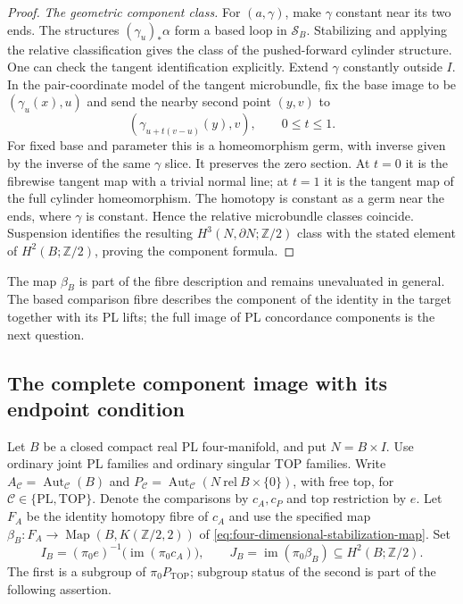 \begin{proof}
\emph{The geometric component class.}
For $(a,\gamma)$, make $\gamma$ constant near its two ends.
The structures $(\gamma_u)_*\alpha$ form a based loop in
$\mathcal S_B$.  Stabilizing and applying the relative classification
gives the class of the pushed-forward cylinder structure.  One can
check the tangent identification explicitly.  Extend $\gamma$
constantly outside $I$.  In the pair-coordinate model of the tangent
microbundle, fix the base image to be $(\gamma_u(x),u)$ and send the
nearby second point $(y,v)$ to
\[
 (\gamma_{u+t(v-u)}(y),v),\qquad 0\leq t\leq1.
\]
For fixed base and parameter this is a homeomorphism germ, with
inverse given by the inverse of the same $\gamma$ slice.  It
preserves the zero section.  At $t=0$ it is the fibrewise tangent
map with a trivial normal line; at $t=1$ it is the tangent map of
the full cylinder homeomorphism.  The homotopy is constant as a
germ near the ends, where $\gamma$ is constant.  Hence the relative
microbundle classes coincide.  Suspension identifies the resulting
$H^3(N,\partial N;\mathbb Z/2)$ class with the stated element of
$H^2(B;\mathbb Z/2)$, proving the component formula.
\end{proof}

The map $\beta_B$ is part of the fibre description and remains
unevaluated in general. The based comparison fibre describes the
component of the identity in the target together with its PL lifts;
the full image of PL concordance components is the next question.


\subsection{The complete component image with its endpoint condition}

Let $B$ be a closed compact real PL four-manifold, and put $N=B\times I$.
Use ordinary joint PL families and ordinary singular TOP families.
Write $A_{\mathcal C}=\operatorname{Aut}_{\mathcal C}(B)$ and
$P_{\mathcal C}=\operatorname{Aut}_{\mathcal C}
(N\ \mathrm{rel}\ B\times\{0\})$, with free top, for
$\mathcal C\in\{\mathrm{PL},\mathrm{TOP}\}$.  Denote the comparisons
by $c_A,c_P$ and top restriction by $e$.  Let $F_A$ be the identity
homotopy fibre of $c_A$ and use the specified map
$\beta_B:F_A\to\operatorname{Map}(B,K(\mathbb Z/2,2))$ of
\eqref{eq:four-dimensional-stabilization-map}.  Set
\[
 I_B=(\pi_0e)^{-1}\bigl(\operatorname{im}(\pi_0c_A)\bigr),
 \qquad J_B=\operatorname{im}(\pi_0\beta_B)
       \subseteq H^2(B;\mathbb Z/2).
\]
The first is a subgroup of $\pi_0P_{\mathrm{TOP}}$; subgroup status
of the second is part of the following assertion.

